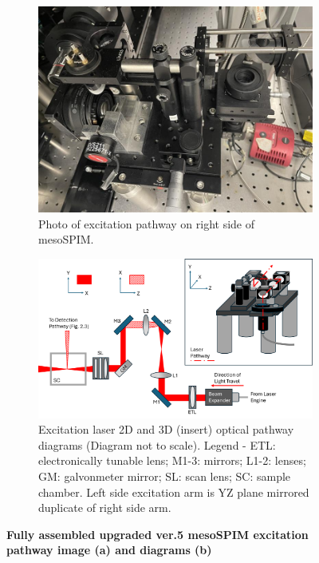 \begin{figure}[H]
    \centering
    \begin{subfigure}[a]{0.75\textwidth}
    \centering
    \includegraphics[width=1\linewidth]{Images/ExcitationPathPhoto.jpg}
    \caption{Photo of excitation pathway on right side of mesoSPIM.}
    \end{subfigure}
    \medskip
    
    \begin{subfigure}[b]{0.75\textwidth}
    \centering
    \includegraphics[width=1\linewidth]{Figures/Excitation Diagram.png}
    \caption{Excitation laser 2D and 3D (insert) optical pathway diagrams (Diagram not to scale). Legend - ETL: electronically tunable lens; M1-3: mirrors; L1-2: lenses; GM: galvonmeter mirror; SL: scan lens; SC: sample chamber. Left side excitation arm is YZ plane mirrored duplicate of right side arm.}
    \end{subfigure}
    \caption{\textbf{Fully assembled upgraded ver.5 mesoSPIM excitation pathway image (a) and diagrams (b)}}
    \label{fig:enter-label}
\end{figure}


